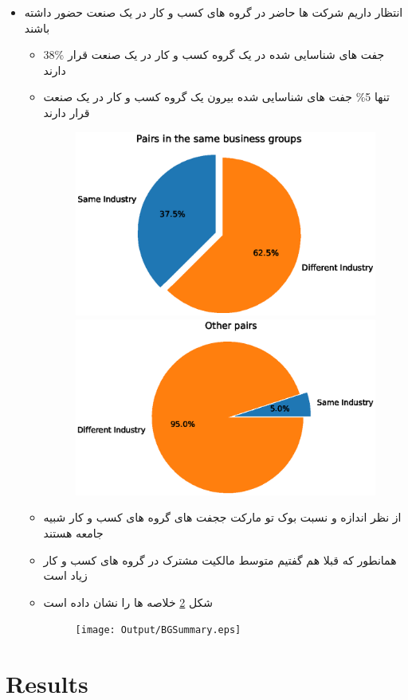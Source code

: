 \documentclass[12pt, a4paper]{article}
\begin{document}
\begin{itemize}
	\item 
	انتظار داریم شرکت ها حاضر در گروه های کسب و کار در یک صنعت حضور داشته باشند
	\begin{itemize}
		\item 
		38\% جفت های شناسایی شده در یک گروه کسب و کار در یک صنعت قرار دارند 
		\item 
		تنها 5\% جفت های شناسایی شده بیرون یک گروه کسب و کار در یک صنعت قرار دارند 
		\begin{figure}[htbp]
			\caption{}
			\label{sameIndustryinBG}
			\centering
			\includegraphics[width=0.48\linewidth]{Output/sameIndustryinBG.eps}
			\includegraphics[width=0.48\linewidth]{Output/sameIndustryNoinBG.eps}
		\end{figure}
		\item 
		از نظر اندازه و نسبت بوک تو مارکت ججفت های گروه های کسب و کار شبیه جامعه هستند
		\item 
		همانطور که قبلا هم گفتیم متوسط مالکیت مشترک در گروه های کسب و کار زیاد است
		\item 
	شکل 
	\ref{BGSummary}
	خلاصه ها را نشان داده است
	\begin{figure}[htbp]
		\caption{}
		\label{BGSummary}
		\centering
		\texttt{[image: Output/BGSummary.eps]}
	\end{figure}
	\end{itemize}
	
	
\end{itemize}


\FloatBarrier




\section{Results}
\end{document}
